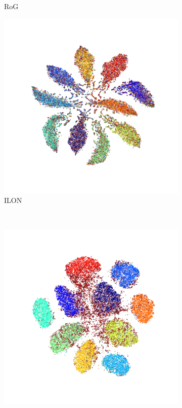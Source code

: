 \documentclass[11pt]{article}
\begin{document}
\begin{figure}[h]
\begin{subfigure}{.18\textwidth}
   \caption*{RoG~}
  \end{subfigure}
  \begin{subfigure}{.18\textwidth}
    \centering
    \includegraphics[width=\linewidth]{images/tsne/tsne_ILON_cifar100.png}
    \caption*{ILON~}
  \end{subfigure}
  \\
  \begin{subfigure}{.18\textwidth}
    \centering
    \includegraphics[width=\linewidth]{images/tsne/tsne_DM_imagenet32.png} 

\end{subfigure}
\end{figure}
\end{document}
